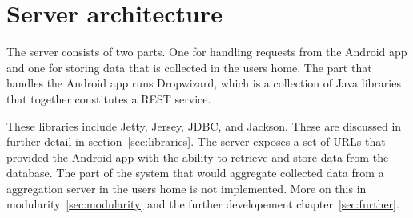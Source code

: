 \section{Server architecture}
The server consists of two parts. One for handling requests from the Android app and one for storing data that is collected in the users home. 
The part that handles the Android app runs Dropwizard, which is a collection of Java libraries that together constitutes a REST service. 

These libraries include Jetty, Jersey, JDBC, and Jackson. These are discussed in further detail in section~\ref{sec:libraries}. The server exposes a set of URLs that provided the Android app with the ability to retrieve and store data from the database. The part of the system that would aggregate collected data from a aggregation server in the users home is not implemented. More on this in modularity~\ref{sec:modularity} and the further developement chapter~\ref{sec:further}.


